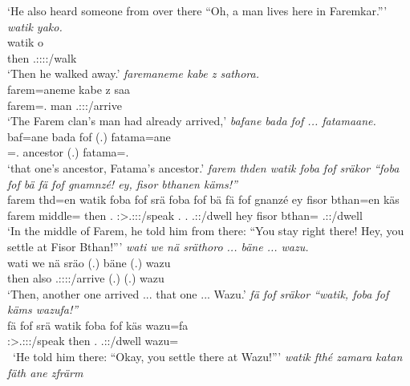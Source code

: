 \begin{exe}
	\trans `He also heard someone from over there ``Oh, a man lives here in Faremkar.'''
	\emph{watik yako.}\\
	\gll watik o\\ 
	then \Tsg.\Masc:\Sbj:\Nonpast:\Ipfv:\Andat/walk\\
	\trans `Then he walked away.'
	\emph{faremaneme kabe z sathora.}\\
	\gll farem=aneme kabe z saa\\ 
	farem=\Poss.\Nsg{} man \Iam{} \Tsg.\Masc:\Sbj:\Pst:\Pfv/arrive\\
	\trans `The Farem clan's man had already arrived,'
	\emph{bafane bada fof ... fatamaane.}\\
	\gll baf=ane bada fof (.) fatama=ane\\ 
	\Recog=\Poss.\Sg{} ancestor \Emph{} (.) fatama=\Poss.\Sg{}\\
	\trans `that one's ancestor, Fatama's ancestor.'
	\emph{farem thden watik foba fof sräkor ``foba fof bä fä fof gnamnzé! ey, fisor bthanen käms!''}\\
	\gll farem thd=en watik foba fof srä foba fof bä fä fof gnanzé ey {fisor bthan=en} käs\\ 
	farem middle=\Loc{} then \Dist.\Abl{} \Emph{} \Stsg:\Sbj>\Tsg.\Masc:\Obj:\Irr:\Pfv/speak \Dist.\Abl{} \Emph{} \Second.\Abs{} \Dist{} \Emph{} \Ssg.\Sbj:\Imp:\Stat/dwell hey {fisor bthan=\Loc{}} \Ssg.\Sbj:\Imp:\Pfv/dwell\\
	\trans `In the middle of Farem, he told him from there: ``You stay right there! Hey, you settle at Fisor Bthan!'''
	\emph{wati we nä sräthoro ... bäne ... wazu.}\\
	\gll wati we nä sräo (.) bäne (.) wazu\\ 
	then also \Indf{} \Tsg.\Masc:\Sbj:\Irr:\Pfv:\Andat/arrive (.) \Recog{} (.) wazu\\
	\trans `Then, another one arrived ... that one ... Wazu.'
	\emph{fä fof sräkor ``watik, foba fof käms wazufa!''}\\
	\gll fä fof srä watik foba fof käs wazu=fa\\ 
	\Dist{} \Emph{} \Stsg:\Sbj>\Tsg.\Masc:\Obj:\Irr:\Pfv/speak then \Dist.\Abl{} \Emph{} \Ssg.\Sbj:\Imp:\Pfv/dwell wazu=\Abl{}\\\
	\trans `He told him there: ``Okay, you settle there at Wazu!'''
\exi{140} 
	\emph{watik fthé zamara katan fäth ane zfrärm}\\

\end{exe}
